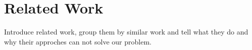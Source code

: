 \section{Related Work} \label{sec:relwork}

Introduce related work, group them by similar work and tell what they do and why their approches can not solve our problem.
